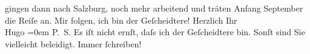 \begin{ledgroupsized}[t]{13cm}
                    gingen dann {\pb}nach Salzburg, noch mehr arbeitend und träten
                        Anfang September die Reiſe an. Mir folgen, ich bin der
                    Geſcheidtere!\pend
           \pstart
           Herzlich Ihr{\\[\baselineskip]}\spacefill\mbox{Hugo}\pend
           \leftskip=0em{}\pstart
           \noindent{}\textsc{P. S.}\pend
           \pstart
           Es iſt nicht ernſt, daſs ich der Geſcheidtere bin. Sonſt sind Sie vielleicht
                        beleidigt.\pend
           \pstart
           \centering{}{\pb}Immer ſchreiben!\pend
           
         
         \endnumbering{}\end{ledgroupsized}  \newcommand{\dateiname}{L00949}\newcommand{\titel}{Hugo von Hofmannsthal an Arthur Schnitzler, 20. 7. [1899]}\newcommand{\editorInnen}{Martin Anton Müller und Gerd-Hermann Susen}
      